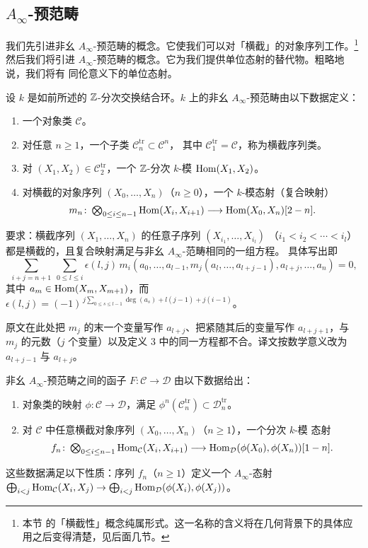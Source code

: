 \subsection{$A_\infty$-预范畴}

我们先引进非幺 $A_\infty$-预范畴的概念。它使我们可以对「横截」的对象序列工作。\footnote{本节
的「横截性」概念纯属形式。这一名称的含义将在几何背景下的具体应用之后变得清楚，见后面几节。}
然后我们将引进 $A_\infty$-预范畴的概念。它为我们提供单位态射的替代物。粗略地说，我们将有
同伦意义下的单位态射。

\begin{dfn}
设 $k$ 是如前所述的 $\mathbb{Z}$-分次交换结合环。$k$ 上的非幺 $A_\infty$-预范畴由以下数据定义：
\begin{enumerate}[label=\alph*),leftmargin=2.2em,itemsep=1pt,topsep=2pt]
\item 一个对象类 $\mathcal{C}$。
\item 对任意 $n\ge1$，一个子类 $\mathcal{C}^{\mathrm{tr}}_n\subset\mathcal{C}^n$，
  其中 $\mathcal{C}^{\mathrm{tr}}_1=\mathcal{C}$，称为横截序列类。
\item 对 $(X_1,X_2)\in\mathcal{C}^{\mathrm{tr}}_2$，一个 $\mathbb{Z}$-分次 $k$-模
  $\operatorname{Hom}(X_1,X_2)$。
\item 对横截的对象序列 $(X_0,\dots,X_n)$（$n\ge0$），一个 $k$-模态射（复合映射）
  \[
  \textstyle m_n\colon\bigotimes_{0\le i\le n-1}\operatorname{Hom}(X_i,X_{i+1})
  \longrightarrow\operatorname{Hom}(X_0,X_n)[2-n].
  \]
\end{enumerate}
要求：横截序列 $(X_1,\dots,X_n)$ 的任意子序列 $(X_{i_1},\dots,X_{i_l})$
（$i_1<i_2<\cdots<i_l$）都是横截的，且复合映射满足与非幺 $A_\infty$-范畴相同的一组方程。
具体写出即
\[
\sum_{i+j=n+1}\ \sum_{0\le l\le i}\epsilon(l,j)\,
m_i(a_0,\dots,a_{l-1},m_j(a_l,\dots,a_{l+j-1}),a_{l+j},\dots,a_n)=0,
\]
其中 $a_m\in\operatorname{Hom}(X_m,X_{m+1})$，而
$\epsilon(l,j)=(-1)^{\,j\sum_{0\le s\le l-1}\deg(a_s)+l(j-1)+j(i-1)}$。
\end{dfn}

\begin{yizhu}[原文的一处下标笔误]
原文在此处把 $m_j$ 的末一个变量写作 $a_{l+j}$、把紧随其后的变量写作 $a_{l+j+1}$，与
$m_j$ 的元数（$j$ 个变量）以及定义 3 中的同一方程都不合。译文按数学意义改为 $a_{l+j-1}$
与 $a_{l+j}$。
\end{yizhu}

\begin{dfn}
非幺 $A_\infty$-预范畴之间的函子 $F\colon\mathcal{C}\to\mathcal{D}$ 由以下数据给出：
\begin{enumerate}[label=\arabic*),leftmargin=2.2em,itemsep=1pt,topsep=2pt]
\item 对象类的映射 $\phi\colon\mathcal{C}\to\mathcal{D}$，满足
  $\phi^n(\mathcal{C}^{\mathrm{tr}}_n)\subset\mathcal{D}^{\mathrm{tr}}_n$。
\item 对 $\mathcal{C}$ 中任意横截对象序列 $(X_0,\dots,X_n)$（$n\ge1$），一个分次 $k$-模
  态射
  \[
  \textstyle f_n\colon\bigotimes_{0\le i\le n-1}\operatorname{Hom}_{\mathcal{C}}(X_i,X_{i+1})
  \longrightarrow\operatorname{Hom}_{\mathcal{D}}(\phi(X_0),\phi(X_n))[1-n].
  \]
\end{enumerate}
这些数据满足以下性质：序列 $f_n$（$n\ge1$）定义一个 $A_\infty$-态射
$\bigoplus_{i<j}\operatorname{Hom}_{\mathcal{C}}(X_i,X_j)\to
\bigoplus_{i<j}\operatorname{Hom}_{\mathcal{D}}(\phi(X_i),\phi(X_j))$。
\end{dfn}

